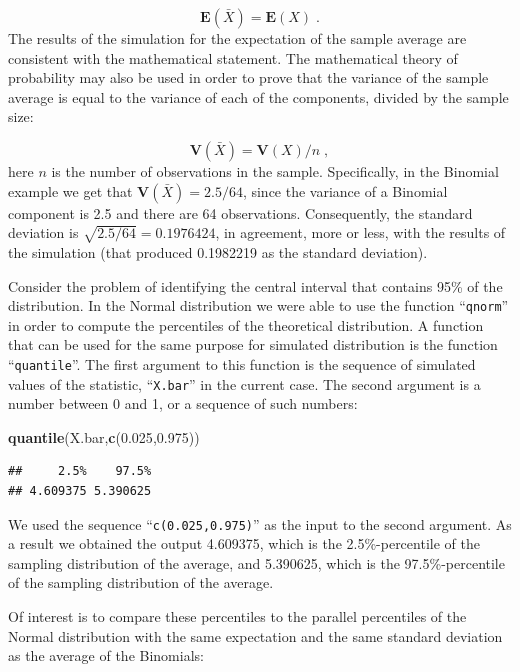 \documentclass[]{krantz}
\makeatletter
\newenvironment{Shaded}{\begin{snugshade}}{\end{snugshade}}
\newcommand{\FloatTok}[1]{\textcolor[rgb]{0.00,0.00,0.81}{#1}}
\newcommand{\KeywordTok}[1]{\textcolor[rgb]{0.13,0.29,0.53}{\textbf{#1}}}
\newcommand{\NormalTok}[1]{#1}
\newcommand{\Expec}{\mathbf{E}}
\newcommand{\Var}{\mathbf{V}}
\newenvironment{kframe}{%
\medskip{}
\setlength{\fboxsep}{.8em}
 \def\at@end@of@kframe{}%
 \ifinner\ifhmode%
  \def\at@end@of@kframe{\end{minipage}}%
  \begin{minipage}{\columnwidth}%
 \fi\fi%
 \def\FrameCommand##1{\hskip\@totalleftmargin \hskip-\fboxsep
 \colorbox{shadecolor}{##1}\hskip-\fboxsep
     \hskip-\linewidth \hskip-\@totalleftmargin \hskip\columnwidth}%
 \MakeFramed {\advance\hsize-\width
   \@totalleftmargin\z@ \linewidth\hsize
   \@setminipage}}%
 {\par\unskip\endMakeFramed%
 \at@end@of@kframe}
\renewenvironment{Shaded}{\begin{kframe}}{\end{kframe}}
\theoremstyle{definition}
\theoremstyle{definition}
\theoremstyle{definition}
\theoremstyle{remark}
\makeatother
\begin{document}
\[\Expec(\bar X) = \Expec(X)\;.\] The results of the simulation for the
expectation of the sample average are consistent with the mathematical
statement. The mathematical theory of probability may also be used in
order to prove that the variance of the sample average is equal to the
variance of each of the components, divided by the sample size:

\[\Var(\bar X) = \Var(X)/n\;,\] here \(n\) is the number of observations
in the sample. Specifically, in the Binomial example we get that
\(\Var(\bar X) = 2.5/64\), since the variance of a Binomial component is
2.5 and there are 64 observations. Consequently, the standard deviation
is \(\sqrt{2.5/64} = 0.1976424\), in agreement, more or less, with the
results of the simulation (that produced 0.1982219 as the standard
deviation).

Consider the problem of identifying the central interval that contains
95\% of the distribution. In the Normal distribution we were able to use
the function ``\texttt{qnorm}'' in order to compute the percentiles of the
theoretical distribution. A function that can be used for the same
purpose for simulated distribution is the function ``\texttt{quantile}''. The
first argument to this function is the sequence of simulated values of
the statistic, ``\texttt{X.bar}'' in the current case. The second argument is a
number between 0 and 1, or a sequence of such numbers:

\begin{Shaded}
\begin{Highlighting}[]
\KeywordTok{quantile}\NormalTok{(X.bar,}\KeywordTok{c}\NormalTok{(}\FloatTok{0.025}\NormalTok{,}\FloatTok{0.975}\NormalTok{))}
\end{Highlighting}
\end{Shaded}

\begin{verbatim}
##     2.5%    97.5% 
## 4.609375 5.390625
\end{verbatim}

We used the sequence ``\texttt{c(0.025,0.975)}'' as the input to the second
argument. As a result we obtained the output 4.609375, which is the
2.5\%-percentile of the sampling distribution of the average, and
5.390625, which is the 97.5\%-percentile of the sampling distribution of
the average.

Of interest is to compare these percentiles to the parallel percentiles
of the Normal distribution with the same expectation and the same
standard deviation as the average of the Binomials:
\end{document}
